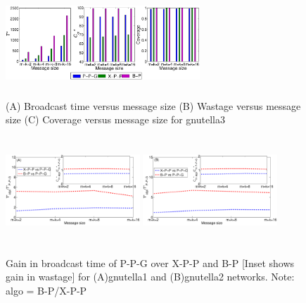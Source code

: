 \begin{figure}[!ht]
  \centering	
 \includegraphics*[width=0.65\textwidth,height=40mm,angle=0]{./texfiles/Chapter_3/netsci/figs1/gnutella25_bt_wa_co.eps}
 
 \caption{\label{gnutellacomp} (A) Broadcast time versus message size (B) Wastage versus message size (C) Coverage versus message size for gnutella3}
\end{figure}


\begin{figure}[!ht]
  \centering	
 \includegraphics*[width=0.45\textwidth,height=40mm,angle=0]{./texfiles/Chapter_3/netsci/figs1/comp_gnut_4.eps}
 \includegraphics*[width=0.45\textwidth,height=40mm,angle=0]{./texfiles/Chapter_3/netsci/figs1/comp_gnut_6.eps}
 
 \caption{\label{gnutellacomp1} Gain in broadcast time of P-P-G over X-P-P and B-P [Inset shows gain in wastage] for (A)gnutella1 and (B)gnutella2 networks. Note: algo = B-P/X-P-P }
\vspace{.5cm}
 \end{figure}
%  

